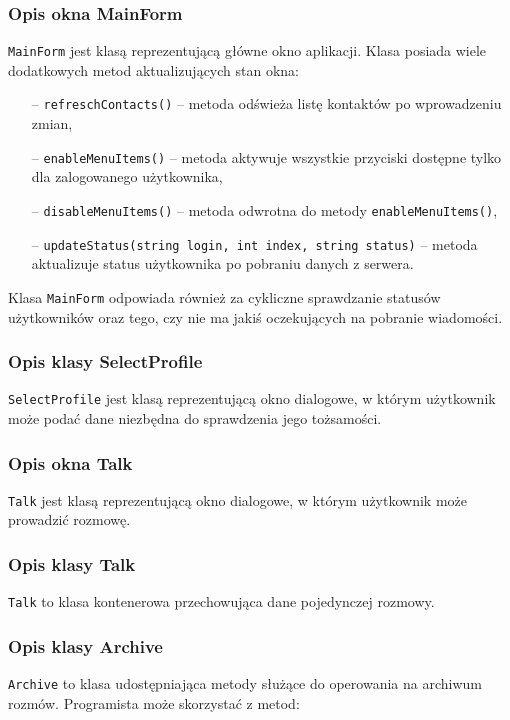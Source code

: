 \documentclass[a4paper,12pt]{article}
\begin{document}
\subsubsection[Opis okna MainForm]{Opis okna MainForm}
\texttt{MainForm} jest klasą reprezentującą główne okno aplikacji. Klasa posiada wiele dodatkowych metod aktualizujących stan okna:

\begin{itemize}
    \item[--] \texttt{refreschContacts()} -- metoda odświeża listę kontaktów po wprowadzeniu zmian,
    \item[--] \texttt{enableMenuItems()} -- metoda aktywuje wszystkie przyciski dostępne tylko dla zalogowanego użytkownika,
    \item[--] \texttt{disableMenuItems()} -- metoda odwrotna do metody \texttt{enableMenuItems()},
    \item[--] \texttt{updateStatus(string login, int index, string status)} -- metoda aktualizuje status użytkownika po pobraniu danych z serwera. 
\end{itemize}

Klasa \texttt{MainForm} odpowiada również za cykliczne sprawdzanie statusów użytkowników oraz tego, czy nie ma jakiś oczekujących na pobranie wiadomości.

\subsubsection[Opis okna SelectProfile]{Opis klasy SelectProfile}
\texttt{SelectProfile} jest klasą reprezentującą okno dialogowe, w którym użytkownik może podać dane niezbędna do sprawdzenia jego tożsamości.

\subsubsection[Opis okna Talk]{Opis okna Talk}
\texttt{Talk} jest klasą reprezentującą okno dialogowe, w którym użytkownik może prowadzić rozmowę.

\subsubsection[Opis klasy Talk]{Opis klasy Talk}
\texttt{Talk} to klasa kontenerowa przechowująca dane pojedynczej rozmowy. 

\subsubsection[Opis klasy Archive]{Opis klasy Archive}
\texttt{Archive} to klasa udostępniająca metody służące do operowania na archiwum rozmów. Programista może skorzystać z metod:
\end{document}
